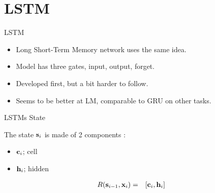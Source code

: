 \documentclass{beamer}
\begin{document}
\section{LSTM}

\begin{frame}{LSTM}
  \begin{itemize}
  \item Long Short-Term Memory network uses the same idea. 
    \air 

  \item Model has three gates, input, output, forget. 
    \air 

  \item Developed first, but a bit harder to follow. 
    \air 

  \item Seems to be better at LM, comparable to GRU on other tasks.
  \end{itemize}
\end{frame}

\begin{frame}{LSTMs State}

  The state $\mathbf{s}_i$ is made of 2 components :
  \begin{itemize}
  \item $\mathbf{c}_i$; cell
  \item $\mathbf{h}_i$; hidden
  \end{itemize}

    \begin{eqnarray*}
      R(\mathbf{s}_{i-1}, \mathbf{x}_i) &=& [\mathbf{c}_i, \mathbf{h}_i]  \\
    \end{eqnarray*}

\end{frame}
\end{document}
